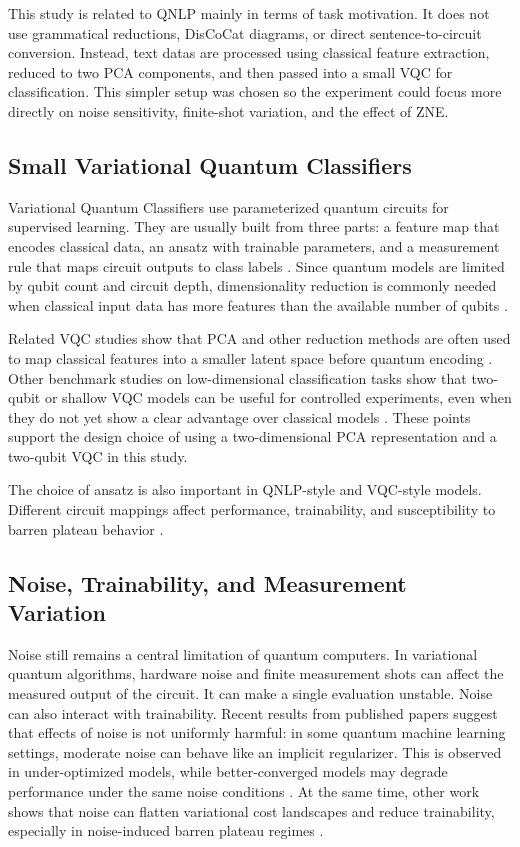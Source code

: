 \documentclass[conference]{IEEEtran}
\begin{document}
This study is related to QNLP mainly in terms of task motivation. It does not
use grammatical reductions, DisCoCat diagrams, or direct sentence-to-circuit
conversion. Instead, text datas are processed using classical feature
extraction, reduced to two PCA components, and then passed into a small VQC for
classification. This simpler setup was chosen so the experiment could focus more
directly on noise sensitivity, finite-shot variation, and the effect of ZNE.

\subsection{Small Variational Quantum Classifiers}

Variational Quantum Classifiers use parameterized quantum circuits for supervised
learning. They are usually built from three parts: a feature map that encodes
classical data, an ansatz with trainable parameters, and a measurement rule that
maps circuit outputs to class labels \cite{b_seilkhan2026, b_higgs}. Since
quantum models are limited by qubit count and circuit depth, dimensionality
reduction is commonly needed when classical input data has more features than
the available number of qubits \cite{b_higgs}.

Related VQC studies show that PCA and other reduction methods are often used to map classical
features into a smaller latent space before quantum encoding \cite{b_higgs}. Other benchmark
studies on low-dimensional classification tasks show that two-qubit or shallow VQC models can
be useful for controlled experiments, even when they do not yet show a clear advantage over
classical models \cite{b_seilkhan2026}.
These points support the design choice of using a two-dimensional PCA representation and a
two-qubit VQC in this study.

The choice of ansatz is also important in QNLP-style and VQC-style models.
Different circuit mappings affect performance, trainability, and
susceptibility to barren plateau behavior \cite{b_khatri2022}.

\subsection{Noise, Trainability, and Measurement Variation}

Noise still remains a central limitation of quantum computers. In variational quantum
algorithms, hardware noise and finite measurement shots can affect the measured output of the
circuit. It can make a single evaluation unstable. Noise can also interact with trainability.
Recent results from published papers suggest that effects of noise is not uniformly harmful: in some quantum machine
learning settings, moderate noise can behave like an implicit regularizer. This is observed in under-optimized
models, while better-converged models may degrade performance under the same noise conditions
\cite{b_zhu2026}. At the same time, other work shows that noise can flatten variational cost
landscapes and reduce trainability, especially in noise-induced barren plateau regimes
\cite{b_wang2021}.
\end{document}
